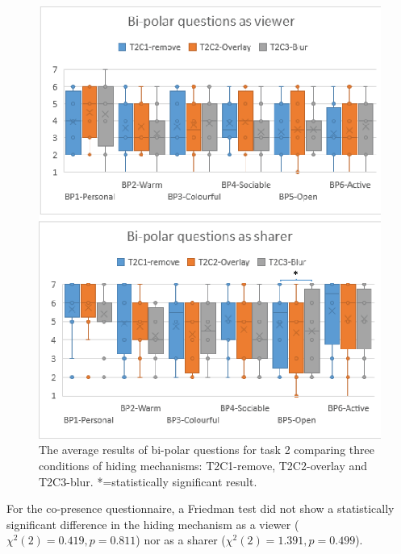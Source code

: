 \begin{figure}
    \begin{center}
    \includegraphics[width=.8\linewidth]{images/54-hiding-frontier18/images-12.eps}
    \caption{The average results of bi-polar questions for task 2 comparing three conditions of hiding mechanisms: T2C1-remove, T2C2-overlay and T2C3-blur. *=statistically significant result.}
    \label{fig:frontier18:result-bipolar-hiding}
    \end{center}
\end{figure}

For the co-presence questionnaire, a Friedman test did not show a statistically significant difference in the hiding mechanism as a viewer ($\chi^2(2)=0.419, p=0.811$) nor as a sharer ($\chi^2(2)=1.391, p=0.499$).


